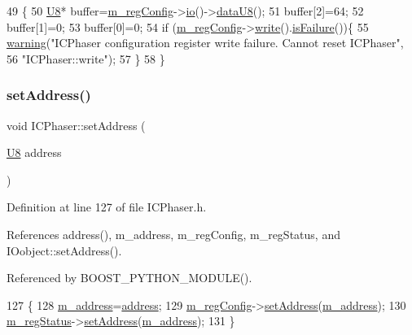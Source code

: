 \begin{DoxyCode}
49                     \{
50   \hyperlink{ICECALv3_8h_a3cb25ca6f51f003950f9625ff05536fc}{U8}* buffer=\hyperlink{classICPhaser_af135fe05b7c087639789afe470e88ce4}{m\_regConfig}->\hyperlink{classIOobject_af04fb94137c3d86849f478ac5afab5d1}{io}()->\hyperlink{classIOdata_a75e9c318dbac3a39402179070943d4bc}{dataU8}();
51   buffer[2]=64;
52   buffer[1]=0;
53   buffer[0]=0;
54   \textcolor{keywordflow}{if} (\hyperlink{classICPhaser_af135fe05b7c087639789afe470e88ce4}{m\_regConfig}->\hyperlink{classIOobject_a9f6984bc9f0fadcf800f1be2523ac744}{write}().\hyperlink{classStatusCode_a5dd22dc6eb2c52fc4cabc58f6dea2eb7}{isFailure}())\{
55     \hyperlink{classObject_a65cd4fda577711660821fd2cd5a3b4c9}{warning}(\textcolor{stringliteral}{"ICPhaser configuration register write failure. Cannot reset ICPhaser"},
56         \textcolor{stringliteral}{"ICPhaser::write"});
57   \}
58 \}
\end{DoxyCode}
\mbox{\label{classICPhaser_aacedf2a891a7946818a38afdbb29b52a}} 
\subsubsection{\texorpdfstring{set\+Address()}{setAddress()}}
{\footnotesize\ttfamily void I\+C\+Phaser\+::set\+Address (\begin{DoxyParamCaption}\item[{\hyperlink{classICPhaser_a4f9b2302efbd7bdd70d7d80b415f1a9d}{U8}}]{address }\end{DoxyParamCaption})\hspace{0.3cm}{\ttfamily [inline]}}



Definition at line 127 of file I\+C\+Phaser.\+h.



References address(), m\+\_\+address, m\+\_\+reg\+Config, m\+\_\+reg\+Status, and I\+Oobject\+::set\+Address().



Referenced by B\+O\+O\+S\+T\+\_\+\+P\+Y\+T\+H\+O\+N\+\_\+\+M\+O\+D\+U\+L\+E().


\begin{DoxyCode}
127                              \{
128     \hyperlink{classICPhaser_a2b3bdff684521d2c3d053662134043ca}{m\_address}=\hyperlink{classICPhaser_ac5cd0f3cb56324782ae8d360944a94fd}{address};
129     \hyperlink{classICPhaser_af135fe05b7c087639789afe470e88ce4}{m\_regConfig}->\hyperlink{classIOobject_ae0d372aaeafe3da3c239677118deb2ac}{setAddress}(\hyperlink{classICPhaser_a2b3bdff684521d2c3d053662134043ca}{m\_address});
130     \hyperlink{classICPhaser_adcc37517abf1390407003c387008262d}{m\_regStatus}->\hyperlink{classIOobject_ae0d372aaeafe3da3c239677118deb2ac}{setAddress}(\hyperlink{classICPhaser_a2b3bdff684521d2c3d053662134043ca}{m\_address});
131   \}
\end{DoxyCode}
\mbox{\label{classICPhaser_a93d99f9980c4a85d0d5570e56ae5d1bb}} 

